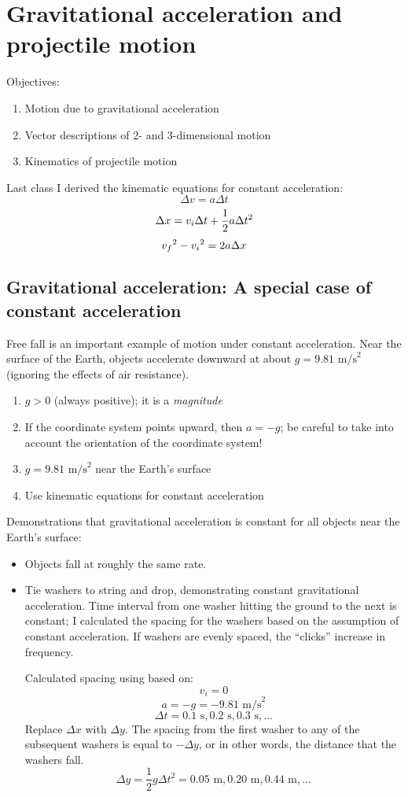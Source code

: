\section{Gravitational acceleration and projectile motion}
Objectives:
\begin{enumerate}
\item Motion due to gravitational acceleration
\item Vector descriptions of 2- and 3-dimensional motion
\item Kinematics of projectile motion
\end{enumerate}
\hrulefill

Last class I derived the kinematic equations for constant acceleration:
$$\Delta{v}=a\Delta{t}$$
$$\Delta{x}=v_i\Delta{t}+\frac{1}{2}a\Delta{t}\displaystyle^2$$
$$v_f\displaystyle^2-v_i\displaystyle^2=2a\Delta{x}$$

\subsection{Gravitational acceleration: A special case of constant acceleration}
Free fall is an important example of motion under constant acceleration. Near the surface of the Earth, objects accelerate downward at about $g=9.81\mbox{ m/s}^2$ (ignoring the effects of air resistance).

\begin{enumerate}
\item $g>0$ (always positive); it is a \textit{magnitude}
\item If the coordinate system points upward, then $a=-g$; be careful to take into account the orientation of the coordinate system!
\item $g=9.81\mbox{ m/s}^2$ near the Earth's surface
\item Use kinematic equations for constant acceleration
\end{enumerate}

Demonstrations that gravitational acceleration is constant for all objects near the Earth's surface:
\begin{itemize}
\item Objects fall at roughly the same rate.
\item Tie washers to string and drop, demonstrating constant gravitational acceleration. Time interval from one washer hitting the ground to the next is constant; I calculated the spacing for the washers based on the assumption of constant acceleration. If washers are evenly spaced, the ``clicks'' increase in frequency.

Calculated spacing using based on:
$$v_i=0$$
$$a=-g=-9.81\mbox{ m/s}^2$$
$$\Delta{t} = 0.1\mbox{ s}, 0.2\mbox{ s},0.3 \mbox{ s},\dots$$
Replace $\Delta{x}$ with $\Delta{y}$. The spacing from the first washer to any of the subsequent washers is equal to $-\Delta{y}$, or in other words, the distance that the washers fall.
$$\Delta{y}=\frac{1}{2}g\Delta{t}^2=0.05\mbox{ m}, 0.20\mbox{ m}, 0.44\mbox{ m},\dots$$
\end{itemize}

